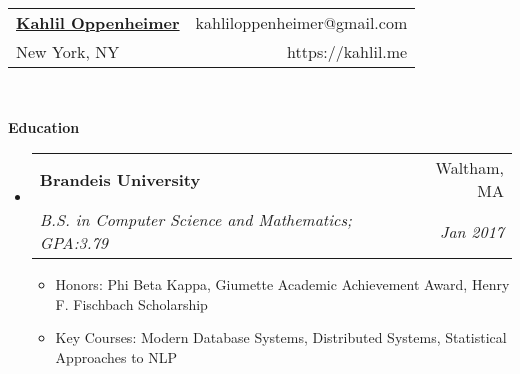 \documentclass[letterpaper,11pt]{article}
\makeatletter
\newcommand{\resitem}[1]{\item #1 \vspace{-2pt}}
\newcommand{\resheading}[1]{{\large \colorbox{mygrey}{\begin{minipage}{\textwidth}{\textbf{#1 \vphantom{p\^{E}}}}\end{minipage}}}}
\newcommand{\ressubheading}[4]{
\begin{tabular*}{6.5in}{l@{\extracolsep{\fill}}r}
		\textbf{#1} & #2 \\
		\textit{#3} & \textit{#4} \\
\end{tabular*}\vspace{-6pt}}
\makeatother
\begin{document}
\newcommand{\mywebheader}{
	\begin{tabular*}{7in}{l@{\extracolsep{\fill}}r}
		\textbf{\LARGE \href{https://kahlil.me}{Kahlil Oppenheimer}} & {kahliloppenheimer@gmail.com} \\
		New York, NY & https://kahlil.me
	\end{tabular*}
	\\
	\vspace{0.1in}}

\mywebheader

\resheading{Education}
\begin{itemize}
	\item
	      \ressubheading{Brandeis University}{Waltham, MA}{B.S. in Computer Science and Mathematics; GPA:3.79}{Jan 2017}
	      { \footnotesize
	      	\begin{itemize}
	      		\resitem{Honors: Phi Beta Kappa, Giumette Academic Achievement Award, Henry F. Fischbach Scholarship}
	      		\resitem{Key Courses: Modern Database Systems, Distributed Systems, Statistical Approaches to NLP}
	      	\end{itemize}
	      }
\end{itemize} %
\end{document}

